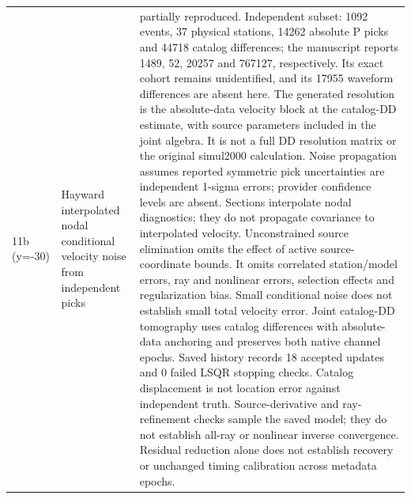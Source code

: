 \begin{longtable}{>{\raggedright\arraybackslash}p{}>{\raggedright\arraybackslash}p{}>{\raggedright\arraybackslash}p{}}
11b (y=-30) & Hayward interpolated nodal conditional velocity noise from independent picks & partially reproduced. Independent subset: 1092 events, 37 physical stations, 14262 absolute P picks and 44718 catalog differences; the manuscript reports 1489, 52, 20257 and 767127, respectively. Its exact cohort remains unidentified, and its 17955 waveform differences are absent here. The generated resolution is the absolute-data velocity block at the catalog-DD estimate, with source parameters included in the joint algebra. It is not a full DD resolution matrix or the original simul2000 calculation. Noise propagation assumes reported symmetric pick uncertainties are independent 1-sigma errors; provider confidence levels are absent. Sections interpolate nodal diagnostics; they do not propagate covariance to interpolated velocity. Unconstrained source elimination omits the effect of active source-coordinate bounds. It omits correlated station/model errors, ray and nonlinear errors, selection effects and regularization bias. Small conditional noise does not establish small total velocity error. Joint catalog-DD tomography uses catalog differences with absolute-data anchoring and preserves both native channel epochs. Saved history records 18 accepted updates and 0 failed LSQR stopping checks. Catalog displacement is not location error against independent truth. Source-derivative and ray-refinement checks sample the saved model; they do not establish all-ray or nonlinear inverse convergence. Residual reduction alone does not establish recovery or unchanged timing calibration across metadata epochs.\\

\end{longtable}
